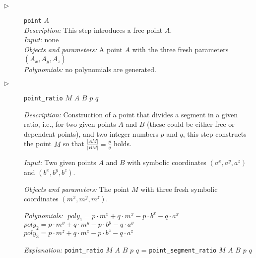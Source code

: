 \documentclass{aicom2e}
\begin{document}
\begin{description}

\item[$\triangleright$] {\tt point} $A$ \\
  {\em Description:} This step introduces a free point $A$.\\
  {\em Input:} none\\
  {\em Objects and parameters:} A point $A$ with the three fresh parameters
  $(A_x, A_y, A_z)$ \\
  {\em Polynomials:} no polynomials are generated. \\

\item[$\triangleright$] {\tt point\_ratio} $M$ $A$ $B$ $p$ $q$ 

  {\em Description:} Construction of a point that divides a segment in
  a given ratio, i.e., for two given points $A$ and $B$ (these could
  be either free or dependent points), and two integer numbers $p$ and
  $q$, this step constructs the point $M$ so that
  $\frac{|AM|}{|BM|} = \frac{p}{q}$ holds.


  {\em Input:} Two given points $A$ and $B$ with symbolic
  coordinates $(a^x, a^y, a^z)$ and $(b^x, b^y, b^z)$.

  {\em Objects and parameters: } The point $M$ with three fresh
  symbolic coordinates $(m^x, m^y, m^z)$.

\begin{tabbing}
{\em Polynomials:} \= $poly_1 = p\cdot m^x + q\cdot m^x - p\cdot b^x - q\cdot a^x$ \\
                   \> $poly_2 = p\cdot m^y + q\cdot m^y - p\cdot b^y - q\cdot a^y$ \\
                   \> $poly_3 = p\cdot m^z + q\cdot m^z - p\cdot b^z - q\cdot a^z$ 
\end{tabbing}

{\em Explanation:} {\tt point\_ratio} $M$ $A$ $B$ $p$ $q$ = {\tt point\_segment\_ratio} $M$ $A$ $B$ $p$ $q$


\end{description}
\end{document}
